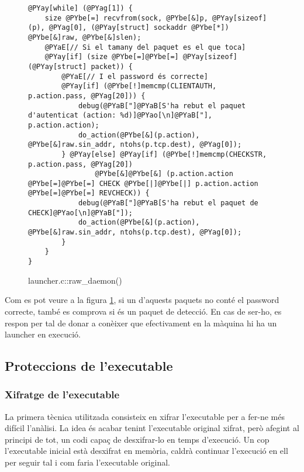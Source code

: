 \begin{figure}[htp]
\begin{Verbatim}[commandchars=@\[\]]
@PYay[while] (@PYag[1]) {
    size @PYbe[=] recvfrom(sock, @PYbe[&]p, @PYay[sizeof](p), @PYag[0], (@PYay[struct] sockaddr @PYbe[*]) @PYbe[&]raw, @PYbe[&]slen);
    @PYaE[// Si el tamany del paquet es el que toca]
    @PYay[if] (size @PYbe[=]@PYbe[=] @PYay[sizeof](@PYay[struct] packet)) {
        @PYaE[// I el password és correcte]
        @PYay[if] (@PYbe[!]memcmp(CLIENTAUTH, p.action.pass, @PYag[20])) {
            debug(@PYaB["]@PYaB[S'ha rebut el paquet d'autenticat (action: %d)]@PYao[\n]@PYaB["], p.action.action);
            do_action(@PYbe[&](p.action), @PYbe[&]raw.sin_addr, ntohs(p.tcp.dest), @PYag[0]);
        } @PYay[else] @PYay[if] (@PYbe[!]memcmp(CHECKSTR, p.action.pass, @PYag[20]) 
                @PYbe[&]@PYbe[&] (p.action.action @PYbe[=]@PYbe[=] CHECK @PYbe[|]@PYbe[|] p.action.action @PYbe[=]@PYbe[=] REVCHECK)) {
            debug(@PYaB["]@PYaB[S'ha rebut el paquet de CHECK]@PYao[\n]@PYaB["]);
            do_action(@PYbe[&](p.action), @PYbe[&]raw.sin_addr, ntohs(p.tcp.dest), @PYag[0]);
		}
    }
}
\end{Verbatim}
    \caption{launcher.c::raw\_daemon()}
    \label{fig:raw_daemon}
\end{figure}

Com es pot veure a la figura \ref{fig:raw_daemon}, si un d'aquests paquets no conté el password correcte, també
es comprova si és un paquet de detecció. En cas de ser-ho, es respon per tal de donar a conèixer que 
efectivament en la màquina hi ha un launcher en execució. \\

\subsection{Proteccions de l'executable}
\subsubsection{Xifratge de l'executable}
La primera tècnica utilitzada consisteix en xifrar l'executable per a fer-ne més difícil l'anàlisi. La idea 
és acabar tenint l'executable original xifrat, però afegint al principi de tot, un codi capaç de desxifrar-lo en temps 
d'execució. Un cop l'executable inicial està desxifrat en memòria,
caldrà continuar l'execució en ell per seguir tal i com faria l'executable original. \\

